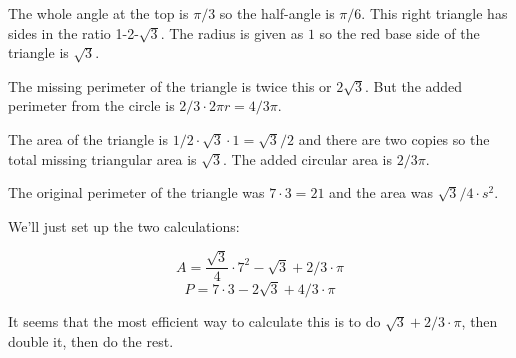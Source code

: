 \documentclass[11pt, oneside]{article}
\begin{document}
The whole angle at the top is $\pi/3$ so the half-angle is $\pi/6$.  This right triangle has sides in the ratio 1-2-$\sqrt{3}$.  The radius is given as $1$ so the red base side of the triangle is $\sqrt{3}$.  

The missing perimeter of the triangle is twice this or $2 \sqrt{3}$.  But the added perimeter from the circle is $2/3 \cdot 2 \pi r = 4/3 \pi$.

The area of the triangle is $1/2 \cdot \sqrt{3} \cdot 1 = \sqrt{3}/2$ and there are two copies so the total missing triangular area is $\sqrt{3}$.  The added circular area is $2/3 \pi$. 

The original perimeter of the triangle was $7 \cdot 3 = 21$ and the area was $\sqrt{3}/4 \cdot s^2$.

We'll just set up the two calculations:

\[ A = \frac{\sqrt{3}}{4} \cdot 7^2 - \sqrt{3} + 2/3 \cdot \pi \]
\[ P = 7 \cdot 3 - 2 \sqrt{3} + 4/3 \cdot \pi \]

It seems that the most efficient way to calculate this is to do $ \sqrt{3} + 2/3 \cdot \pi$, then double it, then do the rest.
\end{document}
